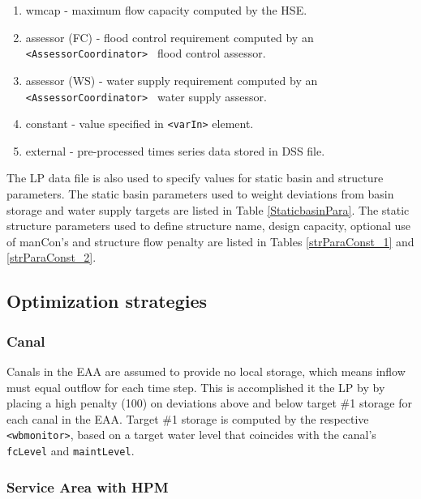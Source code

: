 \begin{enumerate}
 
 \item wmcap \-- maximum flow capacity computed by the HSE.

 \item assessor (FC) \-- flood control requirement computed by an {\tt
   <AssessorCoordinator> } flood control assessor.

 \item assessor (WS) \-- water supply requirement computed by an {\tt
   <AssessorCoordinator> } water supply assessor.

 \item constant \-- value specified in {\tt <varIn>} element.

 \item external \-- pre-processed times series data stored in DSS
   file.

\end{enumerate}

The LP data file is also used to specify values for static basin and
structure parameters.  The static basin parameters used to weight
deviations from basin storage and water supply targets are listed in
Table \ref {StaticbasinPara}.  The static structure parameters used to
define structure name, design capacity, optional use of manCon's and
structure flow penalty are listed in Tables \ref{strParaConst_1}
and \ref{strParaConst_2}.

\subsection {Optimization strategies}

\subsubsection {Canal}

Canals in the EAA are assumed to provide no local storage, which means
inflow must equal outflow for each time step.  This is accomplished it
the LP by by placing a high penalty (100) on deviations above and
below target \#1 storage for each canal in the EAA.  Target \#1
storage is computed by the respective {\tt <wbmonitor>}, based on a
target water level that coincides with the canal's {\tt fcLevel} and
{\tt maintLevel}.

\subsubsection {Service Area with HPM}


